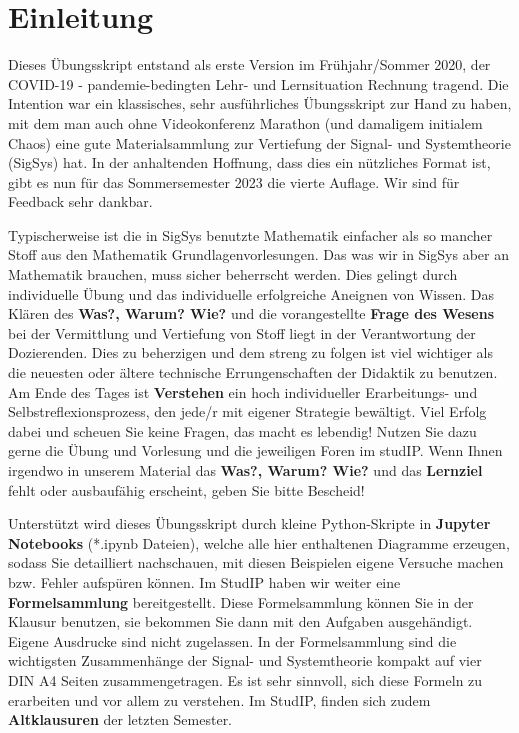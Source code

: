 \newpage
\section*{Einleitung}
%

Dieses Übungsskript entstand als erste Version im Frühjahr/Sommer 2020, der
COVID-19 - pandemie-bedingten Lehr- und Lernsituation Rechnung tragend.
%
Die Intention war ein klassisches, sehr ausführliches Übungsskript zur Hand zu haben,
mit dem man auch ohne Videokonferenz Marathon (und damaligem initialem Chaos)
eine gute Materialsammlung zur Vertiefung der Signal- und Systemtheorie (SigSys)
hat.
%
In der anhaltenden Hoffnung, dass dies ein nützliches Format ist, gibt es nun
für das Sommersemester 2023 die vierte Auflage. Wir sind für Feedback
sehr dankbar.

Typischerweise ist die in SigSys benutzte Mathematik einfacher als so mancher
Stoff aus den Mathematik Grundlagenvorlesungen.
%
Das was wir in SigSys aber an Mathematik brauchen, muss sicher beherrscht werden.
%
Dies gelingt durch individuelle Übung und das individuelle erfolgreiche Aneignen
von Wissen.
%
Das Klären des \textbf{Was?, Warum? Wie?} und die vorangestellte
\textbf{Frage des Wesens} bei der Vermittlung und Vertiefung von Stoff liegt
in der Verantwortung der Dozierenden.
%
Dies zu beherzigen und dem streng zu folgen ist viel wichtiger als die neuesten
oder ältere technische Errungenschaften der Didaktik zu benutzen.
%
Am Ende des Tages ist \textbf{Verstehen} ein hoch individueller Erarbeitungs-
und Selbstreflexionsprozess, den jede/r mit eigener Strategie bewältigt.
%
Viel Erfolg dabei und scheuen Sie keine Fragen, das macht es lebendig!
Nutzen Sie dazu gerne die Übung und Vorlesung und die
jeweiligen Foren im studIP.
%
Wenn Ihnen irgendwo in unserem Material das \textbf{Was?, Warum? Wie?} und das
\textbf{Lernziel} fehlt oder ausbaufähig erscheint, geben Sie bitte Bescheid!

%
Unterstützt wird dieses Übungsskript durch kleine Python-Skripte in
\textbf{Jupyter Notebooks} (*.ipynb Dateien),
welche alle hier enthaltenen Diagramme erzeugen, sodass Sie
detailliert nachschauen, mit diesen Beispielen eigene Versuche machen
bzw. Fehler aufspüren können.
%
Im StudIP haben wir weiter eine \textbf{Formelsammlung} bereitgestellt.
%
Diese Formelsammlung können Sie in der Klausur benutzen, sie bekommen Sie
dann mit den Aufgaben ausgehändigt.
%
Eigene Ausdrucke sind nicht zugelassen.
%
In der Formelsammlung sind die wichtigsten Zusammenhänge der Signal- und
Systemtheorie kompakt auf vier DIN A4 Seiten zusammengetragen.
%
Es ist sehr sinnvoll, sich diese Formeln zu erarbeiten und vor allem zu verstehen.
%
Im StudIP, finden sich zudem \textbf{Altklausuren} der letzten Semester.


